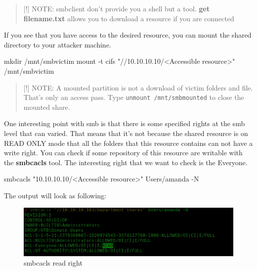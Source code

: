 \documentclass{assets/ipesethesis}
\newenvironment{Shaded}{\begin{snugshade}}{\end{snugshade}}
\newcommand{\ExtensionTok}[1]{#1}
\newcommand{\FunctionTok}[1]{\textcolor[rgb]{0.00,0.00,0.00}{#1}}
\newcommand{\NormalTok}[1]{#1}
\newcommand{\StringTok}[1]{\textcolor[rgb]{0.31,0.60,0.02}{#1}}
\begin{document}
\begin{quote}
{[}!{]} NOTE: smbclient don't provide you a shell but a tool. \textbf{get filename.txt} allows you to download a resource if you are connected
\end{quote}

If you see that you have access to the desired resource, you can mount the shared directory to your attacker machine.

\begin{Shaded}
\begin{Highlighting}[]
\FunctionTok{mkdir}\NormalTok{ /mnt/smbvictim}
\FunctionTok{mount}\NormalTok{ -t cifs }\StringTok{"//10.10.10.10/<Accessible resource>"}\NormalTok{ /mnt/smbvictim}
\end{Highlighting}
\end{Shaded}

\begin{quote}
{[}!{]} NOTE: A mounted partition is not a download of victim folders and file. That's only an access pass. Type \texttt{unmount\ /mnt/smbmounted} to close the
mounted share.
\end{quote}

One interesting point with smb is that there is some specified rights at the smb level that can varied. That means that it's not because the
shared resource is on READ ONLY mode that all the folders that this resource contains can not have a write right. You can check if some repository of
this resource are writable with the \textbf{smbcacls} tool. The interesting right that we want to check is the Everyone.

\begin{Shaded}
\begin{Highlighting}[]
\ExtensionTok{smbcacls} \StringTok{"10.10.10.10/<Accessible resource>"}\NormalTok{ Users/amanda -N}
\end{Highlighting}
\end{Shaded}

The output will look as following:

\begin{figure}
\includegraphics[width=0.9\linewidth]{images/cacls-read} \caption{smbcacls read right}\label{fig:unnamed-chunk-3}
\end{figure}
\end{document}

